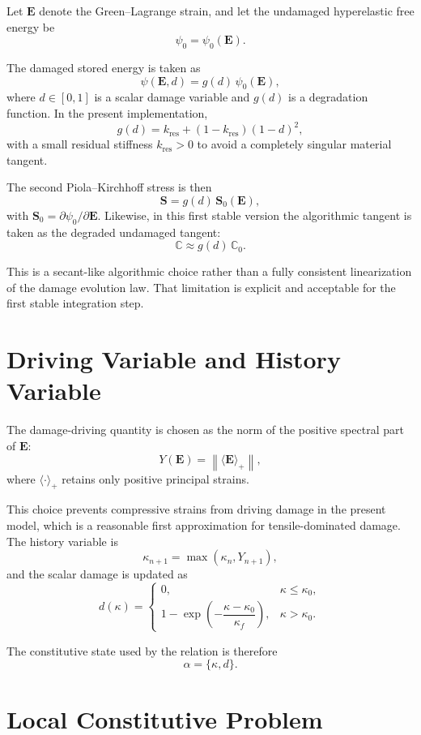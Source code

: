 Let $\mathbf{E}$ denote the Green--Lagrange strain, and let the undamaged
hyperelastic free energy be
\[
  \psi_0 = \psi_0(\mathbf{E}).
\]

The damaged stored energy is taken as
\[
  \psi(\mathbf{E}, d) = g(d)\,\psi_0(\mathbf{E}),
\]
where $d \in [0,1]$ is a scalar damage variable and $g(d)$ is a degradation
function.  In the present implementation,
\[
  g(d) = k_\text{res} + (1-k_\text{res})(1-d)^2,
\]
with a small residual stiffness $k_\text{res} > 0$ to avoid a completely
singular material tangent.

The second Piola--Kirchhoff stress is then
\[
  \mathbf{S} = g(d)\,\mathbf{S}_0(\mathbf{E}),
\]
with $\mathbf{S}_0 = \partial \psi_0 / \partial \mathbf{E}$.  Likewise, in
this first stable version the algorithmic tangent is taken as the degraded
undamaged tangent:
\[
  \mathbb{C} \approx g(d)\,\mathbb{C}_0.
\]

This is a secant-like algorithmic choice rather than a fully consistent
linearization of the damage evolution law.  That limitation is explicit and
acceptable for the first stable integration step.

\section{Driving Variable and History Variable}

The damage-driving quantity is chosen as the norm of the positive spectral part
of $\mathbf{E}$:
\[
  Y(\mathbf{E}) = \left\lVert \langle \mathbf{E} \rangle_+ \right\rVert,
\]
where $\langle \cdot \rangle_+$ retains only positive principal strains.

This choice prevents compressive strains from driving damage in the present
model, which is a reasonable first approximation for tensile-dominated damage.
The history variable is
\[
  \kappa_{n+1} = \max(\kappa_n, Y_{n+1}),
\]
and the scalar damage is updated as
\[
  d(\kappa) =
  \begin{cases}
    0, & \kappa \le \kappa_0, \\
    1 - \exp\left(-\dfrac{\kappa-\kappa_0}{\kappa_f}\right),
      & \kappa > \kappa_0.
  \end{cases}
\]

The constitutive state used by the relation is therefore
\[
  \alpha = \{\kappa, d\}.
\]

\section{Local Constitutive Problem}

